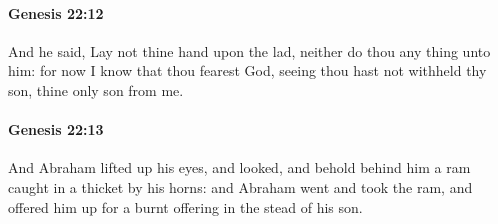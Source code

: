 		\paragraph{Genesis 22:12} %
			\label{GENESIS-22-12}

			And he said, Lay not thine hand upon the lad, neither do thou any thing unto him: for now I know that thou fearest God, seeing thou hast not withheld thy son, thine only son from me.


		\paragraph{Genesis 22:13} %
			\label{GENESIS-22-13}

			And Abraham lifted up his eyes, and looked, and behold behind him a ram caught in a thicket by his horns: and Abraham went and took the ram, and offered him up for a burnt offering in the stead of his son.

